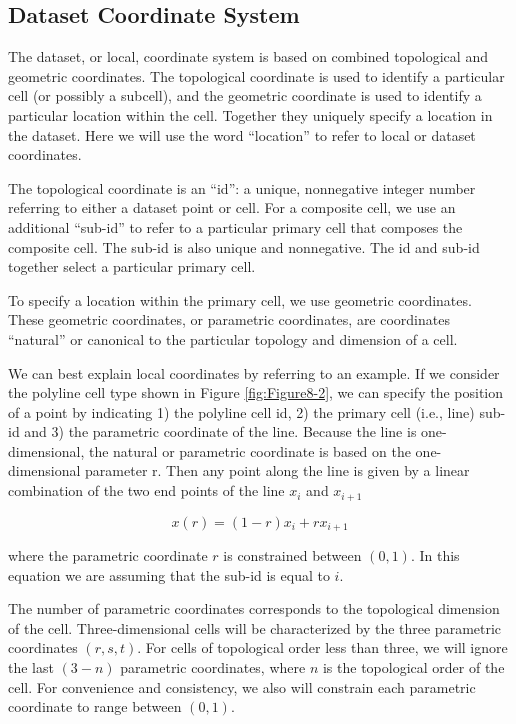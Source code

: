 \subsection{Dataset Coordinate System}

The dataset, or local, coordinate system is based on combined topological and geometric coordinates. The topological coordinate is used to identify a particular cell (or possibly a subcell), and the geometric coordinate is used to identify a particular location within the cell. Together they uniquely specify a location in the dataset. Here we will use the word ``location'' to refer to local or dataset coordinates.

The topological coordinate is an ``id'': a unique, nonnegative integer number referring to either a dataset point or cell. For a composite cell, we use an additional ``sub-id'' to refer to a particular primary cell that composes the composite cell. The sub-id is also unique and nonnegative. The id and sub-id together select a particular primary cell.

To specify a location within the primary cell, we use geometric coordinates. These geometric coordinates, or parametric coordinates, are coordinates ``natural'' or canonical to the particular topology and dimension of a cell.

We can best explain local coordinates by referring to an example. If we consider the polyline cell type shown in Figure \ref{fig:Figure8-2}, we can specify the position of a point by indicating 1) the polyline cell id, 2) the primary cell (i.e., line) sub-id and 3) the parametric coordinate of the line. Because the line is one-dimensional, the natural or parametric coordinate is based on the one-dimensional parameter r. Then any point along the line is given by a linear combination of the two end points of the line $x_i$ and $x_{i+1}$

\begin{equation}\label{eq:8.1}
x(r) = (1 - r) x_i + r x_{i + 1}
\end{equation}

where the parametric coordinate $r$ is constrained between $(0,1)$. In this equation we are assuming that the sub-id is equal to $i$.

The number of parametric coordinates corresponds to the topological dimension of the cell. Three-dimensional cells will be characterized by the three parametric coordinates $(r, s, t)$. For cells of topological order less than three, we will ignore the last $(3 - n)$ parametric coordinates, where $n$ is the topological order of the cell. For convenience and consistency, we also will constrain each parametric coordinate to range between $(0,1)$.

